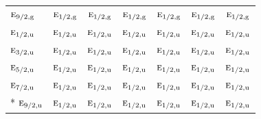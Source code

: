 \documentclass[10pt,a4paper]{article}
\numberwithin{equation}{section}
\newcommand{\irr}[1]{\text{\normalfont\scshape #1}}
\newcommand{\ptag}[1]{\mathrm{#1}}
\begin{document}
{\begin{longtable}{@{}lcccccc@{}}
$\irr{e}_{9/2,\ptag{g}}$ & $\irr{e}_{1/2,\ptag{g}}$ & $\irr{e}_{1/2,\ptag{g}}$ & $\irr{e}_{1/2,\ptag{g}}$ & $\irr{e}_{1/2,\ptag{g}}$ & $\irr{e}_{1/2,\ptag{g}}$ & $\irr{e}_{1/2,\ptag{g}}$\\
$\irr{e}_{1/2,\ptag{u}}$ & $\irr{e}_{1/2,\ptag{u}}$ & $\irr{e}_{1/2,\ptag{u}}$ & $\irr{e}_{1/2,\ptag{u}}$ & $\irr{e}_{1/2,\ptag{u}}$ & $\irr{e}_{1/2,\ptag{u}}$ & $\irr{e}_{1/2,\ptag{u}}$\\
$\irr{e}_{3/2,\ptag{u}}$ & $\irr{e}_{1/2,\ptag{u}}$ & $\irr{e}_{1/2,\ptag{u}}$ & $\irr{e}_{1/2,\ptag{u}}$ & $\irr{e}_{1/2,\ptag{u}}$ & $\irr{e}_{1/2,\ptag{u}}$ & $\irr{e}_{1/2,\ptag{u}}$\\
$\irr{e}_{5/2,\ptag{u}}$ & $\irr{e}_{1/2,\ptag{u}}$ & $\irr{e}_{1/2,\ptag{u}}$ & $\irr{e}_{1/2,\ptag{u}}$ & $\irr{e}_{1/2,\ptag{u}}$ & $\irr{e}_{1/2,\ptag{u}}$ & $\irr{e}_{1/2,\ptag{u}}$\\
$\irr{e}_{7/2,\ptag{u}}$ & $\irr{e}_{1/2,\ptag{u}}$ & $\irr{e}_{1/2,\ptag{u}}$ & $\irr{e}_{1/2,\ptag{u}}$ & $\irr{e}_{1/2,\ptag{u}}$ & $\irr{e}_{1/2,\ptag{u}}$ & $\irr{e}_{1/2,\ptag{u}}$\\*
$\irr{e}_{9/2,\ptag{u}}$ & $\irr{e}_{1/2,\ptag{u}}$ & $\irr{e}_{1/2,\ptag{u}}$ & $\irr{e}_{1/2,\ptag{u}}$ & $\irr{e}_{1/2,\ptag{u}}$ & $\irr{e}_{1/2,\ptag{u}}$ & $\irr{e}_{1/2,\ptag{u}}$\\
\bottomrule\end{longtable}}
\end{document}
